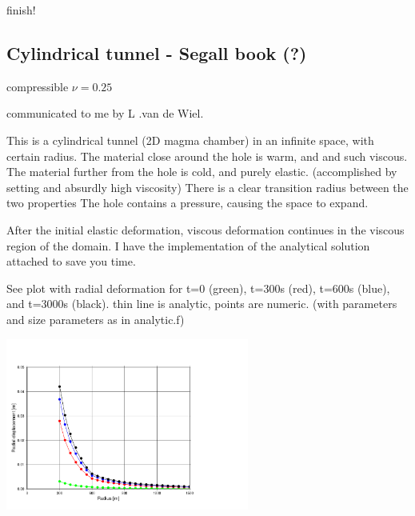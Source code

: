 {\color{red} finish!}










\subsection{Cylindrical tunnel - Segall book (?)}

{\color{orange} compressible $\nu=0.25$}

communicated to me by L .van de Wiel.

This is a cylindrical tunnel (2D magma chamber) in an infinite space, with certain radius.
The material close around the hole is warm, and and such viscous. The material further from the hole is cold, and purely elastic. (accomplished by setting and absurdly high viscosity) 
There is a clear transition radius between the two properties
The hole contains a pressure, causing the space to expand.

After the initial elastic deformation, viscous deformation continues in the viscous region of the domain.
I have the implementation of the analytical solution attached to save you time.

See plot with radial deformation for t=0 (green), t=300s (red), t=600s (blue), and t=3000s (black).
thin line is analytic, points are numeric.
(with parameters and size parameters as in analytic.f)


\begin{center}
\includegraphics[width=8cm]{images/viscoelasticity/radialDisp}
\end{center}











